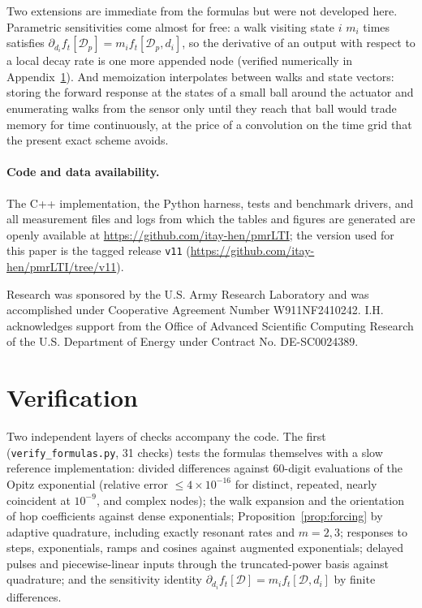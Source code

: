 \documentclass[aps,pra,superscriptaddress,floatfix,longbibliography,twocolumn]{revtex4-2}
\begin{document}
Two extensions are immediate from the formulas but were not developed here. Parametric sensitivities come almost for free: a walk visiting state $i$ $m_i$ times satisfies $\partial_{d_i}f_t[\mathcal{D}_p]=m_if_t[\mathcal{D}_p,d_i]$, so the derivative of an output with respect to a local decay rate is one more appended node (verified numerically in Appendix~\ref{app:verification}). And memoization interpolates between walks and state vectors: storing the forward response at the states of a small ball around the actuator and enumerating walks from the sensor only until they reach that ball would trade memory for time continuously, at the price of a convolution on the time grid that the present exact scheme avoids.

\paragraph*{Code and data availability.} The C++ implementation, the Python harness, tests and benchmark drivers, and all measurement files and logs from which the tables and figures are generated are openly available at \url{https://github.com/itay-hen/pmrLTI}; the version used for this paper is the tagged release \texttt{v11} (\url{https://github.com/itay-hen/pmrLTI/tree/v11}).

\begin{acknowledgments}
Research was sponsored by the U.S. Army Research Laboratory and was accomplished under Cooperative Agreement Number W911NF2410242. I.H. acknowledges support from the Office of Advanced Scientific Computing Research of the U.S. Department of Energy under Contract No. DE-SC0024389.
\end{acknowledgments}

\appendix
\section{Verification}\label{app:verification}

Two independent layers of checks accompany the code. The first (\texttt{verify\_formulas.py}, 31 checks) tests the formulas themselves with a slow reference implementation: divided differences against 60-digit evaluations of the Opitz exponential (relative error $\le4\times10^{-16}$ for distinct, repeated, nearly coincident at $10^{-9}$, and complex nodes); the walk expansion and the orientation of hop coefficients against dense exponentials; Proposition~\ref{prop:forcing} by adaptive quadrature, including exactly resonant rates and $m=2,3$; responses to steps, exponentials, ramps and cosines against augmented exponentials; delayed pulses and piecewise-linear inputs through the truncated-power basis against quadrature; and the sensitivity identity $\partial_{d_i}f_t[\mathcal{D}]=m_if_t[\mathcal{D},d_i]$ by finite differences.
\end{document}
